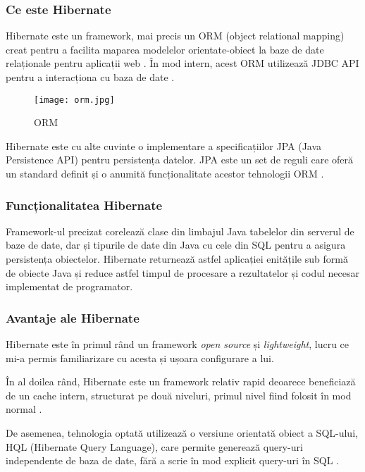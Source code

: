 \subsubsection{Ce este Hibernate}

Hibernate este un framework, mai precis un ORM (object relational mapping) creat pentru a facilita maparea modelelor orientate-obiect la baze de date relaționale pentru aplicații web \cite{hibernate1}. În mod intern, acest ORM utilizează JDBC API pentru a interacționa cu baza de date \cite{hibernate2}.

\begin{figure}[H]
	\centering
	\texttt{[image: orm.jpg]}
	\caption{ORM}
\end{figure}

Hibernate este cu alte cuvinte o implementare a specificațiilor JPA (Java Persistence API) pentru persistența datelor. JPA este un set de reguli care oferă un standard definit și o anumită funcționalitate acestor tehnologii ORM \cite{hibernate2}.

\subsubsection{Funcționalitatea Hibernate}

Framework-ul precizat corelează clase din limbajul Java tabelelor din serverul de baze de date, dar și tipurile de date din Java cu cele din SQL pentru a asigura persistența obiectelor. Hibernate returnează astfel aplicației enitățile sub formă de obiecte Java și reduce astfel timpul de procesare a rezultatelor și codul necesar implementat de programator.

\subsubsection{Avantaje ale Hibernate}

Hibernate este în primul rând un framework \textit{open source} și \textit{lightweight}, lucru ce mi-a permis familiarizare cu acesta și ușoara configurare a lui.

În al doilea rând, Hibernate este un framework relativ rapid deoarece beneficiază de un cache intern, structurat pe două niveluri, primul nivel fiind folosit în mod normal \cite{hibernate2}.

De asemenea, tehnologia optată utilizează o versiune orientată obiect a SQL-ului, HQL (Hibernate Query Language), care permite generează query-uri independente de baza de date, fără a scrie în mod explicit query-uri în SQL \cite{hibernate2}.

